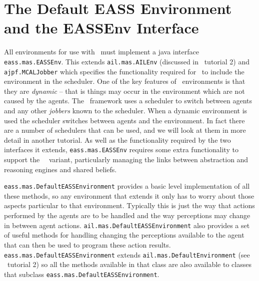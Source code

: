 \section{The Default EASS Environment and the EASSEnv Interface}
\begin{sloppypar}
All environments for use with \eass\ must implement a java interface \texttt{eass.mas.EASSEnv}.  This extends \texttt{ail.mas.AILEnv} (discussed in \ail\ tutorial 2) and \texttt{ajpf.MCALJobber} which specifies the functionality required for \ajpf\ to include the environment in the scheduler.  One of the key features of \eass\ environments is that they are \emph{dynamic} -- that is things may occur in the environment which are not caused by the agents.  The \ajpf\ framework uses a scheduler to switch between agents and any other \emph{jobbers} known to the scheduler.  When a dynamic environment is used the scheduler switches between agents and the environment.  In fact there are a number of schedulers that can be used, and we will look at them in more detail in another tutorial.  As well as the functionality required by the two interfaces it extends, \texttt{eass.mas.EASSEnv} requires some extra functionality to support the \eass\ \gwendolen\ variant, particularly managing the links between abstraction and reasoning engines and shared beliefs.

\texttt{eass.mas.DefaultEASSEnvironment} provides a basic level implementation of all these methods, so any environment that extends it only has to worry about those aspects particular to that environment.  Typically this is just the way that actions performed by the agents are to be handled and the way perceptions may change in between agent actions.  \texttt{ail.mas.DefaultEASSEnvironment} also provides a set of useful methods for handling changing the perceptions available to the agent that can then be used to program these action results.  \texttt{eass.mas.DefaultEASSEnvironment} extends \texttt{ail.mas.DefaultEnvironment} (see \ail\ tutorial 2) so all the methods available in that class are also available to classes that subclass \texttt{eass.mas.DefaultEASSEnvironment}.
\end{sloppypar}

